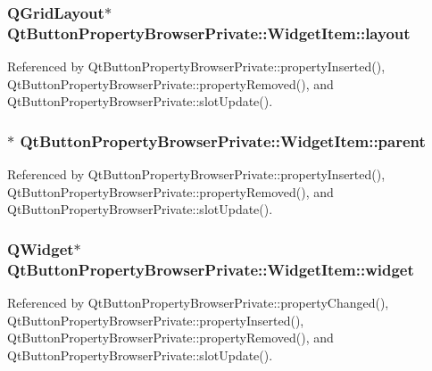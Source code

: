 \subsubsection[{layout}]{\setlength{\rightskip}{0pt plus 5cm}Q\+Grid\+Layout$\ast$ Qt\+Button\+Property\+Browser\+Private\+::\+Widget\+Item\+::layout}\label{structQtButtonPropertyBrowserPrivate_1_1WidgetItem_ac0e81a827db1c90b3b0bad8af892b25f}


Referenced by Qt\+Button\+Property\+Browser\+Private\+::property\+Inserted(), Qt\+Button\+Property\+Browser\+Private\+::property\+Removed(), and Qt\+Button\+Property\+Browser\+Private\+::slot\+Update().

\subsubsection[{parent}]{$\ast$ Qt\+Button\+Property\+Browser\+Private\+::\+Widget\+Item\+::parent}\label{structQtButtonPropertyBrowserPrivate_1_1WidgetItem_a8fb819181fdef67e09cffca907d19ed1}


Referenced by Qt\+Button\+Property\+Browser\+Private\+::property\+Inserted(), Qt\+Button\+Property\+Browser\+Private\+::property\+Removed(), and Qt\+Button\+Property\+Browser\+Private\+::slot\+Update().

\subsubsection[{widget}]{\setlength{\rightskip}{0pt plus 5cm}Q\+Widget$\ast$ Qt\+Button\+Property\+Browser\+Private\+::\+Widget\+Item\+::widget}\label{structQtButtonPropertyBrowserPrivate_1_1WidgetItem_a1259ae00a45296b7a30c61935ae0313d}


Referenced by Qt\+Button\+Property\+Browser\+Private\+::property\+Changed(), Qt\+Button\+Property\+Browser\+Private\+::property\+Inserted(), Qt\+Button\+Property\+Browser\+Private\+::property\+Removed(), and Qt\+Button\+Property\+Browser\+Private\+::slot\+Update().

